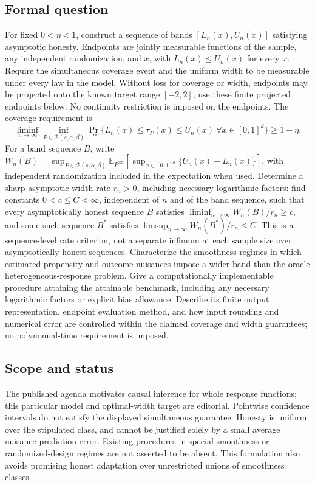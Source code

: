 \documentclass[11pt,a4paper]{article}
\newcommand{\E}{\mathbb E}
\begin{document}
\subsection*{Formal question}
For fixed $0<\eta<1$, construct a sequence of bands $[L_n(x),U_n(x)]$ satisfying asymptotic honesty. Endpoints are jointly measurable functions of the sample, any independent randomization, and $x$, with $L_n(x)\leq U_n(x)$ for every $x$. Require the simultaneous coverage event and the uniform width to be measurable under every law in the model. Without loss for coverage or width, endpoints may be projected onto the known target range $[-2,2]$; use these finite projected endpoints below. No continuity restriction is imposed on the endpoints. The coverage requirement is
\[
 \liminf_{n\to\infty}\inf_{P\in\mathcal P(s,\alpha,\beta)}
 \Pr_P\{L_n(x)\leq\tau_P(x)\leq U_n(x)\ \forall x\in[0,1]^d\}
 \geq1-\eta.
\]
For a band sequence $B$, write $W_n(B)=\sup_{P\in\mathcal P(s,\alpha,\beta)}\E_{P^{\otimes n}}[\sup_{x\in[0,1]^d}\{U_n(x)-L_n(x)\}]$, with independent randomization included in the expectation when used. Determine a sharp asymptotic width rate $r_n>0$, including necessary logarithmic factors: find constants $0<c\leq C<\infty$, independent of $n$ and of the band sequence, such that every asymptotically honest sequence $B$ satisfies $\liminf_{n\to\infty}W_n(B)/r_n\geq c$, and some such sequence $B^*$ satisfies $\limsup_{n\to\infty}W_n(B^*)/r_n\leq C$. This is a sequence-level rate criterion, not a separate infimum at each sample size over asymptotically honest sequences. Characterize the smoothness regimes in which estimated propensity and outcome nuisances impose a wider band than the oracle heterogeneous-response problem. Give a computationally implementable procedure attaining the attainable benchmark, including any necessary logarithmic factors or explicit bias allowance. Describe its finite output representation, endpoint evaluation method, and how input rounding and numerical error are controlled within the claimed coverage and width guarantees; no polynomial-time requirement is imposed.
\subsection*{Scope and status}
The published agenda motivates causal inference for whole response functions; this particular model and optimal-width target are editorial. Pointwise confidence intervals do not satisfy the displayed simultaneous guarantee. Honesty is uniform over the stipulated class, and cannot be justified solely by a small average nuisance prediction error. Existing procedures in special smoothness or randomized-design regimes are not asserted to be absent. This formulation also avoids promising honest adaptation over unrestricted unions of smoothness classes.
\end{document}
